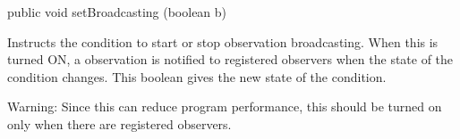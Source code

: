 \begin{htmlonly}
\end{htmlonly}
\begin{code}

   public void setBroadcasting (boolean b)\begin{hide} {
      broadcasting = b;
   }
}\end{hide}
\end{code}
\begin{tabb}  Instructs the condition to start or stop observation broadcasting.
  When this is turned ON, a  observation is notified to
  registered observers when the state of the condition changes.  This
  boolean gives the new state of the condition.

Warning: Since this can reduce program performance, this should be
turned on only when there are registered observers.
\end{tabb}
\begin{htmlonly}
\end{htmlonly}
